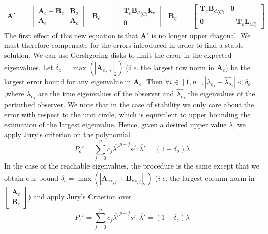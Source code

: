\documentclass[sigconf]{llncs}
\newcommand{\mat}[1]{\boldsymbol{#1}}
\begin{document}
{\setlength{\abovedisplayskip}{0pt}
\begin{align*}
\mat{A}'=&\left [\begin{array}{cc}\mat{A}_{c}+\mat{B}_{e}&\mat{B}_{o}\\ \mat{A}_{e}&\mat{A}_{o}\end{array}\right]&
\mat{B}_{c}=&\left[\begin{array}{c}\mat{T}_c{\mat{B}_d}_{\langle C \rangle}\mat{k}_r\\\mat{0}\end{array}\right]&
\mat{B}_{\eta}=&\left[\begin{array}{cc}\mat{T}_c{\mat{B}_d}_{\langle C \rangle}&\mat{0}\\\mat{0}&-\mat{T}_o\mat{L}_{\langle C \rangle}\end{array}\right]
\end{align*}
}
The first effect of this new equation is that $\mat{A}'$ is no longer upper
diagonal.  We must therefore compensate for the errors introduced in order
to find a stable solution.  We can use Gershgoring  disks to limit the error
in the expected eigenvalues.  Let $\delta_o=\max(|{\mat{A}_e}_{i,*}|_2)$
(\emph{i.e.} the largest row norm in $\mat{A}_e$) be the largest error bound
for any eigenvalue in $\mat{A}_e$.  Then $\forall i \in [1, n],
|{\lambda_o}_{i}-\hat{\lambda_o}_{i}|<\delta_o$,where ${\lambda_o}_{i}$ are the
true eigenvalues of the observer and $\hat{\lambda_o}_{i}$ the eigenvalues of
the perturbed observer.  We note that in the case of stability we only care
about the error with respect to the unit circle, which is equivalent to
upper bounding the estimation of the largest eigenvalue.  Hence, given a
desired upper value $\overline{\lambda}$, we apply Jury's criterion on the
polynomial.
%
\begin{equation}
P_o'=\sum_{j=0}^p c_j\overline{\lambda'}^{p-j}s^j : \overline{\lambda'}=(1+\delta_o)\overline{\lambda}
\end{equation}
%
In the case of the reachable eigenvalues, the procedure is the same except
that we obtain our bound $\delta_c=\max(|{\mat{A}_e}_{*,i}+{\mat{B}_e}_{*,i}|_2)$
(\emph{i.e.} the largest column norm in $ \left[\begin{array}{c}\mat{A}_e\\ \mat{B}_e\end{array}\right]$) and
apply Jury's Criterion over
%
\begin{equation}
P_r'=\sum_{j=0}^p c_j\overline{\lambda'}^{p-j}s^j : \overline{\lambda'}=(1+\delta_c)\overline{\lambda}
\end{equation}
\end{document}
